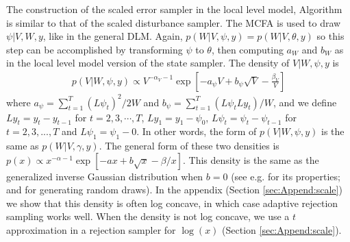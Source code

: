 \documentclass{article}
\begin{document}
The construction of the scaled error sampler in the local level model, Algorithm  is similar to that of the scaled disturbance sampler. The MCFA is used to draw $\psi|V,W,y$, like in the general DLM. Again, $p(W|V,\psi,y)=p(W|V,\theta,y)$ so this step can be accomplished by transforming $\psi$ to $\theta$, then computing $a_W$ and $b_W$ as in the local level model version of the state sampler. The density of $V|W,\psi,y$ is
\begin{align*}
 p(V|W,\psi,y) \propto V^{-\alpha_V - 1}\exp\left[ -a_{\psi}V + b_{\psi}\sqrt{V} -\frac{\beta_V}{V}\right] 
\end{align*}
where $a_{\psi}=\sum_{t=1}^T(L\psi_t)^2/2W$ and $b_{\psi}=\sum_{t=1}^T(L\psi_tLy_t)/W$, and we define $Ly_t=y_t-y_{t-1}$ for $t=2,3,\cdots,T$, $Ly_1=y_1 - \psi_0$, $L\psi_t = \psi_t - \psi_{t-1}$ for $t=2,3,...,T$ and $L\psi_1=\psi_1-0$. In other words, the form of $p(V|W,\psi,y)$ is the same as $p(W|V,\gamma,y)$. The general form of these two densities is $p(x)\propto x^{-\alpha-1}\exp\left[ -ax + b\sqrt{x} -\beta/x\right]$. This density is the same as the generalized inverse Gaussian distribution when $b=0$ (see e.g.  for its properties;  and  for generating random draws). In the appendix (Section \ref{sec:Append:scale}) we show that this density is often log concave, in which case adaptive rejection sampling \cite{gilks1992adaptive} works well. When the density is not log concave, we use a $t$ approximation in a rejection sampler for $\log(x)$ (Section \ref{sec:Append:scale}).
\end{document}
